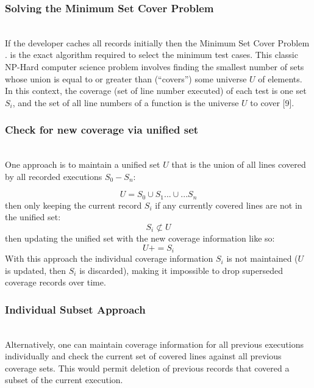 \subsubsection{Solving the Minimum Set Cover Problem}\label{sec:tuning-2}
 \hfill\\
If the developer caches all records initially then the Minimum Set Cover Problem
\cite{hassin2005better}. is the exact algorithm required to select the minimum test cases.
This classic NP-Hard computer science problem involves finding the smallest number
  of sets whose union is equal to or greater than (“covers”) some universe $U$ of elements.  
  In this context, the coverage (set of line number executed) of each test is one set $S_i$,
 and the set of all line numbers of a function is the universe $U$ to cover [9]. 

\subsubsection{Check for new coverage via unified set}\label{sec:tuning-2}
\hfill\\
One approach is to maintain a unified set $U$ that is the union of all lines 
covered by all recorded executions $S_0-S_n$: 

\begin{equation*}
  U = S_0 \cup S_1 ...\cup... S_n
\end{equation*}
then only keeping the current record $S_i$ if any currently 
covered lines are not in the unified set:
\begin{equation*}
  S_i \not \subset U
\end{equation*}
then updating the unified set with the new coverage information like so:
\begin{equation*}
  U += S_i
\end{equation*} 
With this approach the individual coverage information $S_i$ is not maintained 
($U$ is updated, then $S_i$ is discarded), making it impossible to drop superseded 
coverage records over time.  

\subsubsection{Individual Subset Approach}\label{sec:tuning-2}
\hfill\\
Alternatively, one can maintain coverage information for all previous
 executions individually and check the current set of covered lines
  against all previous coverage sets.  This would permit deletion of 
  previous records that covered a subset of the current execution.  

